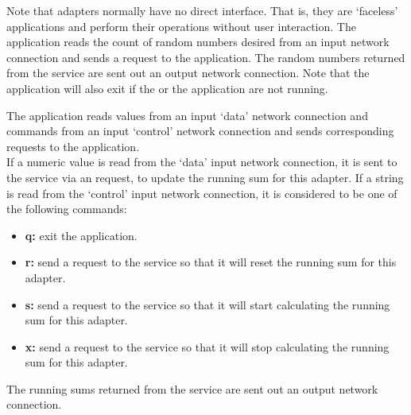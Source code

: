 Note that adapters normally have no direct interface.
That is, they are `faceless' applications and perform their operations without user
interaction.
The  application reads the count of
random numbers desired from an input \yarp{} network connection and sends a
 request to the
 application.
The random numbers returned from the service are sent out an output \yarp{} network
connection.
Note that the application will also exit if the
 or the
 application are not running.

The  application reads  values from an input
`data' \yarp{} network connection and commands from an input `control' \yarp{} network
connection and sends corresponding requests to the
 application.\\

If a numeric value is read from the `data' input \yarp{} network connection, it is sent to
the service via an  request, to update the
running sum for this adapter.
If a string is read from the `control' input \yarp{} network connection, it is considered
to be one of the following commands:
\begin{itemize}
\item\textbf{q:} exit the application.
\item\exSp\textbf{r:} send a  request to the
service so that it will reset the running sum for this adapter.
\item\exSp\textbf{s:} send a  request to the
service so that it will start calculating the running sum for this adapter.
\item\exSp\textbf{x:} send a  request to the
service so that it will stop calculating the running sum for this adapter.
\end{itemize}
The running sums returned from the service are sent out an output \yarp{} network
connection.\\

